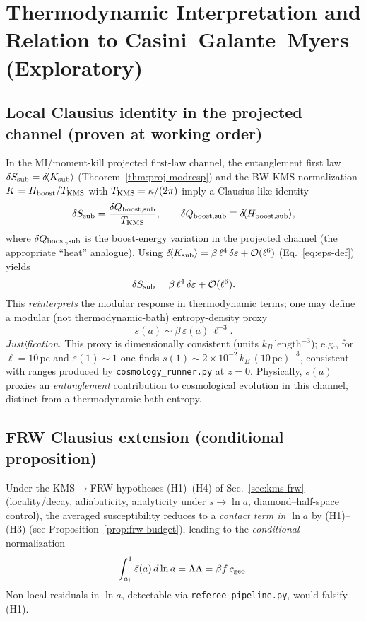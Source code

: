 \documentclass[aps,prd,onecolumn,superscriptaddress,nofootinbib]{revtex4-2}
\def\Omega_\Lambda{OmegaLambda}%
\providecommand{\be}{\begin{equation}}
\providecommand{\ee}{\end{equation}}
\begin{document}
\section{Thermodynamic Interpretation and Relation to Casini–Galante–Myers (Exploratory)}
\label{sec:thermo}

\subsection{Local Clausius identity in the projected channel (proven at working order)}
In the MI/moment-kill projected first-law channel, the entanglement first law \(\delta S_{\rm sub}=\delta\!\langle K_{\rm sub}\rangle\) (Theorem~\ref{thm:proj-modresp}) and the BW KMS normalization \(K=H_{\rm boost}/T_{\rm KMS}\) with \(T_{\rm KMS}=\kappa/(2\pi)\) imply a Clausius-like identity
\be
\delta S_{\rm sub}=\frac{\delta Q_{\rm boost,sub}}{T_{\rm KMS}}, \qquad
\delta Q_{\rm boost,sub}\equiv \delta\!\langle H_{\rm boost,sub}\rangle,
\ee
where \(\delta Q_{\rm boost,sub}\) is the boost-energy variation in the projected channel (the appropriate ``heat'' analogue). Using \(\delta\!\langle K_{\rm sub}\rangle=\beta\,\ell^4\,\delta\varepsilon+\mathcal O(\ell^6)\) (Eq.~\ref{eq:eps-def}) yields
\be
\delta S_{\rm sub}=\beta\,\ell^4\,\delta\varepsilon+\mathcal O(\ell^6).
\label{eq:clausius-response}
\ee
This \emph{reinterprets} the modular response in thermodynamic terms; one may define a modular (not thermodynamic-bath) entropy-density proxy
\[
s(a)\sim \beta\,\varepsilon(a)\,\ell^{-3}.
\]
\emph{Justification.} This proxy is dimensionally consistent (units \(k_B\,\mathrm{length}^{-3}\)); e.g., for \(\ell=10\,\mathrm{pc}\) and \(\varepsilon(1)\sim 1\) one finds \(s(1)\sim 2\times 10^{-2}\,k_B\,(10\,\mathrm{pc})^{-3}\), consistent with ranges produced by \texttt{cosmology\_runner.py} at \(z=0\). Physically, \(s(a)\) proxies an \emph{entanglement} contribution to cosmological evolution in this channel, distinct from a thermodynamic bath entropy.

\subsection{FRW Clausius extension (conditional proposition)}
Under the KMS\(\to\)FRW hypotheses (H1)–(H4) of Sec.~\ref{sec:kms-frw} (locality/decay, adiabaticity, analyticity under \(s\to\ln a\), diamond–half-space control), the averaged susceptibility reduces to a \emph{contact term in \(\ln a\)} by (H1)–(H3) (see Proposition~\ref{prop:frw-budget}), leading to the \emph{conditional} normalization
\be
\int_{a_i}^{1}\bar\varepsilon(a)\,d\ln a=\Omega_\Lambda=\beta f\,c_{\rm geo}.
\ee
Non-local residuals in \(\ln a\), detectable via \texttt{referee\_pipeline.py}, would falsify (H1).
\end{document}
